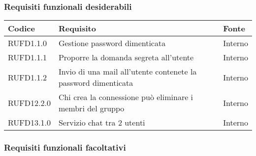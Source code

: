\subsubsection{Requisiti funzionali desiderabili}

\begin{center}
\begin{longtable}{lp{}l}
\toprule Codice & Requisito & Fonte\\
\midrule
RUFD1.1.0 & Gestione password dimenticata & Interno \\
RUFD1.1.1 & Proporre la domanda segreta all'utente & Interno \\
RUFD1.1.2 & Invio di una mail all'utente contenete la password dimenticata & Interno \\
RUFD12.2.0 & Chi crea la connessione può eliminare i membri del gruppo & Interno \\
RUFD13.1.0 & Servizio chat tra 2 utenti & Interno \\
\bottomrule
\end{longtable}
\end{center}

\subsubsection{Requisiti funzionali facoltativi}

